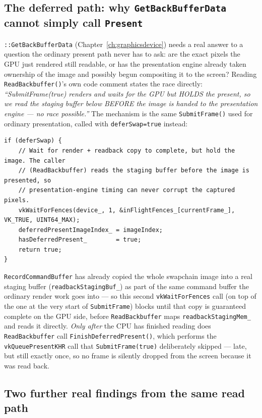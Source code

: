 \subsection{The deferred path: why \texttt{GetBackBufferData} cannot simply call \texttt{Present}}

\texttt{::GetBackBufferData} (Chapter~\ref{ch:graphicsdevice}) needs a
real answer to a question the ordinary present path never has to ask: are the exact pixels the
GPU just rendered still readable, or has the presentation engine already taken ownership of
the image and possibly begun compositing it to the screen? Reading
\texttt{ReadBackbuffer()}'s own code comment states the race directly: \emph{``SubmitFrame(true)
renders and waits for the GPU but HOLDS the present, so we read the staging buffer below
BEFORE the image is handed to the presentation engine --- no race possible.''} The mechanism is
the same \texttt{SubmitFrame()} used for ordinary presentation, called with
\texttt{deferSwap=true} instead:

\begin{lstlisting}
if (deferSwap) {
    // Wait for render + readback copy to complete, but hold the image. The caller
    // (ReadBackbuffer) reads the staging buffer before the image is presented, so
    // presentation-engine timing can never corrupt the captured pixels.
    vkWaitForFences(device_, 1, &inFlightFences_[currentFrame_], VK_TRUE, UINT64_MAX);
    deferredPresentImageIndex_ = imageIndex;
    hasDeferredPresent_        = true;
    return true;
}
\end{lstlisting}

\texttt{RecordCommandBuffer} has already copied the whole swapchain image into a real staging
buffer (\texttt{readbackStagingBuf\_}) as part of the same command buffer the ordinary render
work goes into --- so this second \texttt{vkWaitForFences} call (on top of the one at the very
start of \texttt{SubmitFrame}) blocks until that copy is guaranteed complete on the GPU side,
before \texttt{ReadBackbuffer} maps \texttt{readbackStagingMem\_} and reads it directly.
\emph{Only after} the CPU has finished reading does \texttt{ReadBackbuffer} call
\texttt{FinishDeferredPresent()}, which performs the \texttt{vkQueuePresentKHR} call that
\texttt{SubmitFrame(true)} deliberately skipped --- late, but still exactly once, so no frame
is silently dropped from the screen because it was read back.

\subsection{Two further real findings from the same read path}

